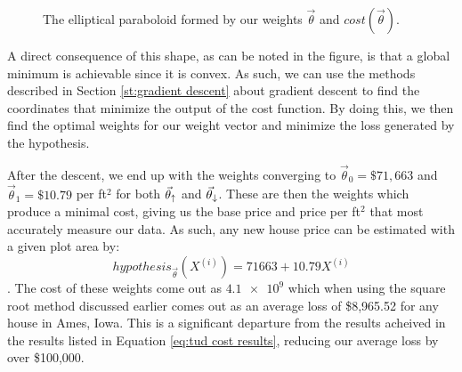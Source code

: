 \begin{figure}[t!]
    \centering
    \caption{The elliptical paraboloid formed by our weights $\vec\theta$ and $cost(\vec\theta)$.}
    \label{fg:cost}
\end{figure}

A direct consequence of this shape, as can be noted in the figure, is that a
global minimum is achievable since it is convex. As such, we can use
the methods described in Section \ref{st:gradient descent} about gradient
descent to find the coordinates that minimize the output of the cost function.
By doing this, we then find the optimal weights for our weight vector and
minimize the loss generated by the hypothesis.


 After the descent, we
end up with the weights converging to $\vec\theta_0 = \$71,663$ and
$\vec\theta_1 = \$10.79$ per ft$^2$ for both $\vec\theta_{\uparrow}$ and $\vec\theta_{\downarrow}$. These are then the
weights which produce a minimal cost, giving us the base price and price per
ft$^2$ that most accurately measure our data. As such, any new house price can
be estimated with a given plot area by:
\begin{equation}
    hypothesis_{\vec\theta}(X^{(i)}) = 71663 + 10.79X^{(i)}	
\end{equation}.
The cost of these weights come out as $\num{4.1e9}$ which when using the
square root method discussed earlier comes out as an average loss of \$8,965.52
for any house in Ames, Iowa. This is a significant departure from the results
acheived in the results listed in Equation \ref{eq:tud cost results}, reducing our
average loss by over \$100,000.



